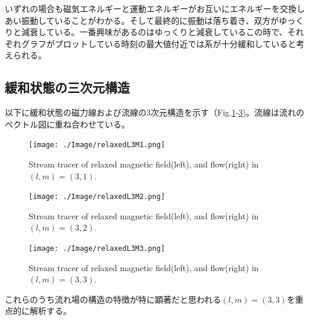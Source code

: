 \documentclass[12pt]{jsarticle}
\begin{document}
いずれの場合も磁気エネルギーと運動エネルギーがお互いにエネルギーを交換しあい振動していることがわかる。そして最終的に振動は落ち着き、双方がゆっくりと減衰している。一番興味があるのはゆっくりと減衰しているこの時で、それぞれグラフがプロットしている時刻の最大値付近では系が十分緩和していると考えられる。


\subsection{緩和状態の三次元構造}
以下に緩和状態の磁力線および流線の3次元構造を示す（Fig.\ref{L3M1_relaxed}-\ref{L3M3_relaxed})。流線は流れのベクトル図に重ね合わせている。

\begin{figure}[H]
\centering
\texttt{[image: ./Image/relaxedL3M1.png]}
\caption{Stream tracer of relaxed magnetic field(left), and flow(right) in $(l,m)=(3,1)$.} \label{L3M1_relaxed}
\end{figure}
\begin{figure}[H]
\centering
\texttt{[image: ./Image/relaxedL3M2.png]}
\caption{Stream tracer of relaxed magnetic field(left), and flow(right) in $(l,m)=(3,2)$.} \label{L3M2_relaxed}
\end{figure}
\begin{figure}[H]
\centering
\texttt{[image: ./Image/relaxedL3M3.png]}
\caption{Stream tracer of relaxed magnetic field(left), and flow(right) in $(l,m)=(3,3)$.}\label{L3M3_relaxed}
\end{figure}

これらのうち流れ場の構造の特徴が特に顕著だと思われる$(l,m)=(3,3)$を重点的に解析する。
\end{document}
